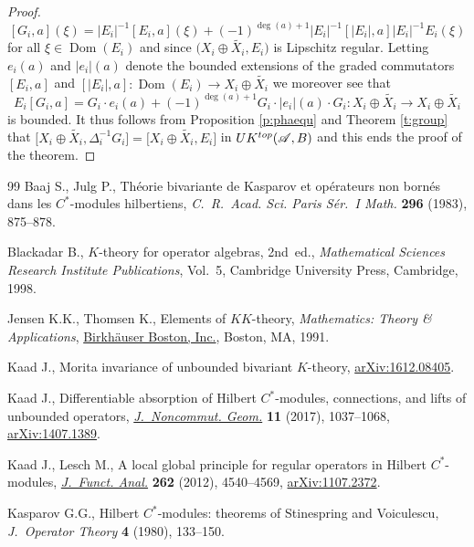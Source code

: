 \documentclass[11pt]{article}
\numberwithin{equation}{section}
\newcommand{\cd}{\cdot}
\newcommand{\op}{\oplus}
\newcommand{\De}{\Delta}
\newcommand{\s}[1]{\mathscr{#1}}
\newcommand{\wit}{\widetilde}
\begin{document}
\begin{proof}
\[
[G_i,a](\xi) = |E_i|^{-1} [E_i,a](\xi) + (-1)^{\deg (a) + 1} |E_i|^{-1}[|E_i|, a] |E_i|^{-1} E_i(\xi)
\]
for all $\xi \in \operatorname{Dom}(E_i)$ and since $\big(X_i \op \wit{X_i}, E_i\big)$ is Lipschitz regular. Letting $e_i(a)$ and $|e_i|(a)$ denote the bounded extensions of the graded commutators $[E_i,a]$ and $[|E_i|,a]\colon \operatorname{Dom}(E_i) \to X_i \op \wit{X_i}$ we moreover see that
\[
E_i [G_i,a] = G_i \cd e_i(a) + (-1)^{\deg (a) + 1} G_i \cd |e_i|(a) \cd G_i\colon X_i \op \wit{X_i} \to X_i \op \wit{X_i}
\]
is bounded. It thus follows from Proposition \ref{p:phaequ} and Theorem \ref{t:group} that $\big[X_i \op \wit{X_i}, \De_i^{-1} G_i\big] = \big[X_i \op \wit{X_i}, E_i\big]$ in $UK^{{\rm top}}(\s A,B)$ and this ends the proof of the theorem.
\end{proof}
\begin{thebibliography}{99}
Baaj S., Julg P., Th\'eorie bivariante de {K}asparov et op\'erateurs non
 born\'es dans les {$C^*$}-modules hilbertiens, \textit{C.~R.~Acad. Sci. Paris
 S\'er.~I Math.} \textbf{296} (1983), 875--878.

Blackadar B., {$K$}-theory for operator algebras, 2nd~ed., \textit{Mathematical Sciences
 Research Institute Publications}, Vol.~5, Cambridge University
 Press, Cambridge, 1998.

Jensen K.K., Thomsen K., Elements of {$KK$}-theory, \textit{Mathematics: Theory \&
 Applications}, \href{https://doi.org/10.1007/978-1-4612-0449-7}{Birkh\"auser Boston, Inc.}, Boston, MA, 1991.

Kaad J., Morita invariance of unbounded bivariant {$K$}-theory,
 \href{https://arxiv.org/abs/1612.08405}{arXiv:1612.08405}.

Kaad J., Differentiable absorption of {H}ilbert {$C^*$}-modules, connections,
 and lifts of unbounded operators, \href{https://doi.org/10.4171/JNCG/11-3-8}{\textit{J.~Noncommut. Geom.}} \textbf{11}
 (2017), 1037--1068, \href{https://arxiv.org/abs/1407.1389}{arXiv:1407.1389}.

Kaad J., Lesch M., A local global principle for regular operators in {H}ilbert
 {$C^*$}-modules, \href{https://doi.org/10.1016/j.jfa.2012.03.002}{\textit{J.~Funct. Anal.}} \textbf{262} (2012), 4540--4569,
 \href{https://arxiv.org/abs/1107.2372}{arXiv:1107.2372}.

Kasparov G.G., Hilbert {$C^*$}-modules: theorems of {S}tinespring and
 {V}oiculescu, \textit{J.~Operator Theory} \textbf{4} (1980), 133--150.


\end{thebibliography}
\end{document}
